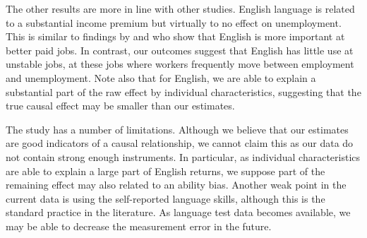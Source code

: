 \documentclass[12pt, a4paper]{article}
\begin{document}
The other results are more in line with other studies.
English language is related to a substantial income premium but
virtually to no effect on unemployment.  This is similar to findings by
\citet{ginsburgh+prieto-rodriguez2011ILRR} and \cite{fabo+2017E}
 who show that English is more important at better paid
jobs.  In contrast, our outcomes suggest that English has little use
at unstable jobs, at these jobs where workers frequently move between
employment and unemployment.
Note also that for
English, we are able to explain a substantial part of the raw effect
by individual characteristics, suggesting that the true causal effect
may be smaller than our estimates.

The study has a number of limitations.  Although we believe that our
estimates are good indicators of a causal relationship, we cannot 
claim this as our data do not contain strong enough instruments.
In particular, as individual characteristics are able to explain a
large part of English returns, we suppose part of the remaining effect
may also related to an ability bias.  Another weak point in the current
data is using the self-reported language
skills, although this is the standard practice in the literature.  As language test data becomes available, we may be able to
decrease the measurement error in the future.




\clearpage
\appendix


\listoffixmes
\end{document}
